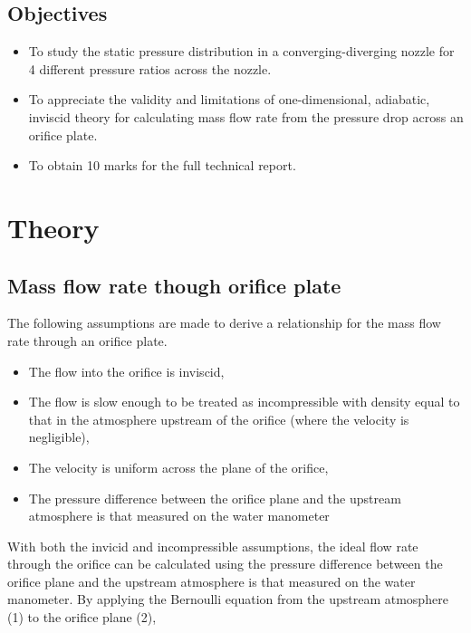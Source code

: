 \documentclass{article}
\begin{document}

\subsection{Objectives}

\begin{itemize}
    \item To study the static pressure distribution in a converging-diverging nozzle for 4 different pressure ratios across the nozzle.
    \item To appreciate the validity and limitations of one-dimensional, adiabatic, inviscid theory for calculating mass flow rate from the pressure drop across an orifice plate.
    \item To obtain 10 marks for the full technical report.
\end{itemize}

\section{Theory}

\subsection{Mass flow rate though orifice plate}

The following assumptions are made to derive a relationship for the mass flow rate through an orifice plate.
\begin{itemize}
    \item The flow into the orifice is inviscid,
    \item The flow is slow enough to be treated as incompressible with density equal to that in the atmosphere upstream of the orifice (where the velocity is negligible),
    \item The velocity is uniform across the plane of the orifice,
    \item The pressure difference between the orifice plane and the upstream atmosphere is that measured on the water manometer
\end{itemize} 

With both the invicid and incompressible assumptions, the ideal flow rate through the orifice can be calculated using the pressure difference between the orifice plane and the upstream atmosphere is that measured on the
water manometer. By applying the Bernoulli equation from the upstream atmosphere (1) to the orifice plane (2),
\end{document}
